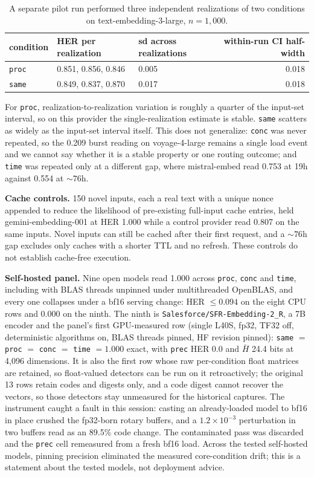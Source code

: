 \documentclass{article}
\begin{document}
\begin{table}[H]
\centering\caption{A separate pilot run performed three independent realizations of two conditions on text-embedding-3-large, $n=1{,}000$.}\label{tab:replication}\footnotesize\setlength{\tabcolsep}{5pt}
\begin{tabular}{lllr}
\toprule
condition & HER per realization & sd across realizations & within-run CI half-width \\
\midrule
\texttt{proc} & 0.851, 0.856, 0.846 & 0.005 & 0.018 \\
\texttt{same} & 0.849, 0.837, 0.870 & 0.017 & 0.018 \\
\bottomrule
\end{tabular}
\end{table}

For \texttt{proc}, realization-to-realization variation is roughly a quarter of the input-set interval, so on this provider the single-realization estimate is stable. \texttt{same} scatters as widely as the input-set interval itself. This does not generalize: \texttt{conc} was never repeated, so the 0.209 burst reading on voyage-4-large remains a single load event and we cannot say whether it is a stable property or one routing outcome; and \texttt{time} was repeated only at a different gap, where mistral-embed read 0.753 at 19h against 0.554 at ${\sim}76$h.

\textbf{Cache controls.} 150 novel inputs, each a real text with a unique nonce appended to reduce the likelihood of pre-existing full-input cache entries, held gemini-embedding-001 at HER 1.000 while a control provider read 0.807 on the same inputs. Novel inputs can still be cached after their first request, and a ${\sim}76$h gap excludes only caches with a shorter TTL and no refresh. These controls do not establish cache-free execution.

\textbf{Self-hosted panel.} Nine open models read 1.000 across \texttt{proc}, \texttt{conc} and \texttt{time}, including with BLAS threads unpinned under multithreaded OpenBLAS, and every one collapses under a bf16 serving change: HER $\le0.094$ on the eight CPU rows and 0.000 on the ninth. The ninth is \texttt{Salesforce/SFR-Embedding-2\_R}, a 7B encoder and the panel's first GPU-measured row (single L40S, fp32, TF32 off, deterministic algorithms on, BLAS threads pinned, HF revision pinned): \texttt{same} $=$ \texttt{proc} $=$ \texttt{conc} $=$ \texttt{time} $=1.000$ exact, with \texttt{prec} HER 0.0 and $\bar H$ 24.4 bits at 4{,}096 dimensions. It is also the first row whose raw per-condition float matrices are retained, so float-valued detectors can be run on it retroactively; the original 13 rows retain codes and digests only, and a code digest cannot recover the vectors, so those detectors stay unmeasured for the historical captures. The instrument caught a fault in this session: casting an already-loaded model to bf16 in place crushed the fp32-born rotary buffers, and a $1.2\times10^{-3}$ perturbation in two buffers read as an 89.5\% code change. The contaminated pass was discarded and the \texttt{prec} cell remeasured from a fresh bf16 load. Across the tested self-hosted models, pinning precision eliminated the measured core-condition drift; this is a statement about the tested models, not deployment advice.
\end{document}
